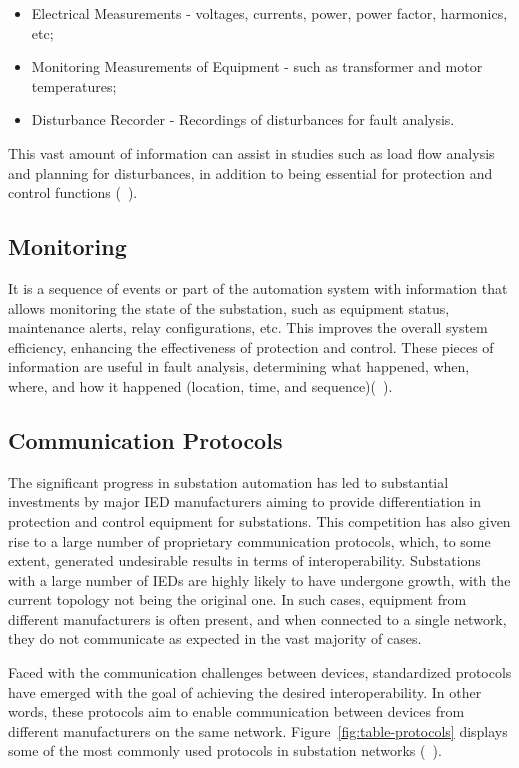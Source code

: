 \begin{itemize}
	\item Electrical Measurements - voltages, currents, power, power factor, harmonics, etc;
	\item Monitoring Measurements of Equipment - such as transformer and motor temperatures;
	\item Disturbance Recorder - Recordings of disturbances for fault analysis.
\end{itemize}

This vast amount of information can assist in studies such as load flow analysis and planning for disturbances, in addition to being essential for protection and control functions (~\cite{NormaIEC61850}).

\subsection{Monitoring}
It is a sequence of events or part of the automation system with information that allows monitoring the state of the substation, such as equipment status, maintenance alerts, relay configurations, etc. This improves the overall system efficiency, enhancing the effectiveness of protection and control. These pieces of information are useful in fault analysis, determining what happened, when, where, and how it happened (location, time, and sequence)(~\cite{NormaIEC61850}).

\subsection{Communication Protocols}
The significant progress in substation automation has led to substantial investments by major IED manufacturers aiming to provide differentiation in protection and control equipment for substations. This competition has also given rise to a large number of proprietary communication protocols, which, to some extent, generated undesirable results in terms of interoperability. Substations with a large number of IEDs are highly likely to have undergone growth, with the current topology not being the original one. In such cases, equipment from different manufacturers is often present, and when connected to a single network, they do not communicate as expected in the vast majority of cases.

Faced with the communication challenges between devices, standardized protocols have emerged with the goal of achieving the desired interoperability. In other words, these protocols aim to enable communication between devices from different manufacturers on the same network. Figure~\ref{fig:table-protocols} displays some of the most commonly used protocols in substation networks (~\cite{NormaIEC61850}).

